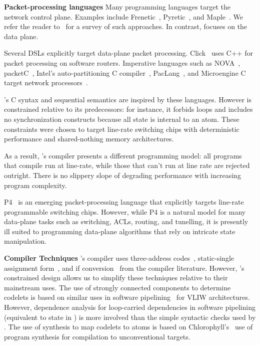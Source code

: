 \textbf{Packet-processing languages}
Many programming languages target the network control plane. Examples include
Frenetic~\cite{frenetic}, Pyretic~\cite{pyretic}, and Maple~\cite{maple}. We
refer the reader to~\cite{language_survey} for a survey of such approaches.  In
contrast, \pktlanguage focuses on the data plane.

Several DSLs explicitly target data-plane packet processing. Click~\cite{click}
uses C++ for packet processing on software routers. Imperative
languages such as NOVA~\cite{nova}, packetC~\cite{packetc}, Intel's
auto-partitioning C compiler~\cite{intel_uiuc_pldi}, PacLang~\cite{paclang_lang,
paclang_partitioner}, and Microengine C~\cite{microenginec, intel_ixa} target
network processors~\cite{ixp2800, ixp4xx}.

\pktlanguage's C syntax and sequential semantics are inspired by these
languages. However \pktlanguage is constrained relative to its predecessors:
for instance, it forbids loops and includes no synchronization constructs
because all state is internal to an atom. These constraints were chosen to
target line-rate switching chips with deterministic performance and
shared-nothing memory architectures.

As a result, \pktlanguage's compiler presents a different programming model:
all \pktlanguage programs that compile run at line-rate, while those that can't
run at line rate are rejected outright. There is no slippery slope of degrading
performance with increasing program complexity.

P4~\cite{p4} is an emerging packet-processing language that explicitly targets
line-rate programmable switching chips. However, while P4 is a natural model
for many data-plane tasks such as switching, ACLs, routing, and tunelling, it
is presently ill suited to programming data-plane algorithms that rely on
intricate state manipulation.

\textbf{Compiler Techniques}
\pktlanguage's compiler uses three-address codes~\cite{tac}, static-single
assignment form~\cite{ssa}, and if conversion~\cite{if_conversion} from the
compiler literature. However, \pktlanguage's constrained design allows us to
simplify these techniques relative to their mainstream uses.  The use of
strongly connected components to determine codelets is based on similar uses in
software pipelining~\cite{software_pipelining} for VLIW architectures. However,
dependence analysis for loop-carried dependencies in software pipelining
(equivalent to state in \pktlanguage) is more involved than the simple
syntactic checks used by \pktlanguage. The use of synthesis to map codelets to
atoms is based on Chlorophyll's~\cite{chlorophyll} use of program synthesis for
compilation to unconventional targets.


